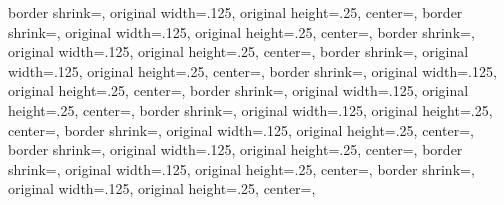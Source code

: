 {{  }%
  {%
  	border shrink=\pgfpageoptionborder,%
  	original width=.125\pgfpageoptionheight,%
  	original height=.25\pgfpageoptionwidth,%
	center=\pgfpoint{.75\pgfphysicalwidth}{.875\pgfphysicalheight},%
  }%
%
%
%
{%
	border shrink=\pgfpageoptionborder,%
	original width=.125\pgfpageoptionheight,%
	original height=.25\pgfpageoptionwidth,%
	center=\pgfpoint{0pt}{.75\pgfphysicalheight},%
}%
{%
	border shrink=\pgfpageoptionborder,%
	original width=.125\pgfpageoptionheight,%
	original height=.25\pgfpageoptionwidth,%
	center=\pgfpoint{.25\pgfphysicalwidth}{.75\pgfphysicalheight},%
}%
{%
	border shrink=\pgfpageoptionborder,%
	original width=.125\pgfpageoptionheight,%
	original height=.25\pgfpageoptionwidth,%
	center=\pgfpoint{.5\pgfphysicalwidth}{.75\pgfphysicalheight},%
}%
{
	border shrink=\pgfpageoptionborder,%
	original width=.125\pgfpageoptionheight,%
	original height=.25\pgfpageoptionwidth,%
	center=\pgfpoint{.75\pgfphysicalwidth}{.75\pgfphysicalheight},%
}%
%
%
%
{%
	border shrink=\pgfpageoptionborder,%
	original width=.125\pgfpageoptionheight,%
	original height=.25\pgfpageoptionwidth,%
	center=\pgfpoint{0pt}{.625\pgfphysicalheight},%
}%
{%
	border shrink=\pgfpageoptionborder,%
	original width=.125\pgfpageoptionheight,%
	original height=.25\pgfpageoptionwidth,%
	center=\pgfpoint{.25\pgfphysicalwidth}{.625\pgfphysicalheight},%
}%
{%
	border shrink=\pgfpageoptionborder,%
	original width=.125\pgfpageoptionheight,%
	original height=.25\pgfpageoptionwidth,%
	center=\pgfpoint{.5\pgfphysicalwidth}{.625\pgfphysicalheight},%
}%
{%
	border shrink=\pgfpageoptionborder,%
	original width=.125\pgfpageoptionheight,%
	original height=.25\pgfpageoptionwidth,%
	center=\pgfpoint{.75\pgfphysicalwidth}{.625\pgfphysicalheight},%
}%
%
%
%
%
{%
	border shrink=\pgfpageoptionborder,%
	original width=.125\pgfpageoptionheight,%
	original height=.25\pgfpageoptionwidth,%
	center=\pgfpoint{0pt}{.5\pgfphysicalheight},%
}%
{%
	border shrink=\pgfpageoptionborder,%
	original width=.125\pgfpageoptionheight,%
	original height=.25\pgfpageoptionwidth,%
	center=\pgfpoint{.25\pgfphysicalwidth}{.5\pgfphysicalheight},%
}%
}

